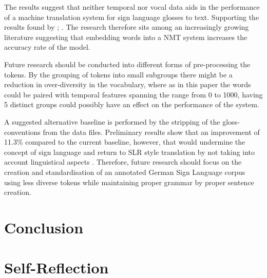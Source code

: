 The results suggest that neither temporal nor vocal data aids in the performance of a machine translation system for sign language glosses to text. Supporting the results found by \citealt{camgoz2018neural}; \citealt{qi2018and}. The research therefore sits among an increasingly growing literature suggesting that embedding words into a NMT system increases the accuracy rate of the model.

Future research should be conducted into different forms of pre-processing the tokens. By the grouping of tokens into small subgroups there might be a reduction in over-diversity in the vocabulary, where as in this paper the words could be paired with temporal features spanning the range from 0 to 1000, having 5 distinct groups could possibly have an effect on the performance of the system.

A suggested alternative baseline is performed by the stripping of the gloss-conventions \cite{konradoffentliches} from the data files. Preliminary results show that an improvement of 11.3\% compared to the current baseline, however, that would undermine the concept of sign language and return to SLR style translation  by not taking into account linguistical aspects \cite{camgoz2018neural}. Therefore, future research should focus on the creation and standardisation of an annotated German Sign Language corpus using less diverse tokens while maintaining proper grammar by proper sentence creation.


\section{Conclusion}


\section{Self-Reflection}

